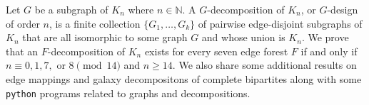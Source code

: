 
Let $G$ be a subgraph of $K_n$ where $n \in \mathbb{N}$. A $G$-decomposition of $K_n$, or $G$-design of order $n$, is a finite collection $\{G_1, \ldots, G_k\}$ of pairwise edge-disjoint subgraphs of $K_n$ that are all isomorphic to some graph $G$ and whose union is $K_{n}$. We prove that an $F$-decomposition of $K_n$ exists for every seven edge forest $F$ if and only if $n \equiv 0,1,7, \text{ or } 8 \pmod{14}$ and $n\geq 14$. We also share some additional results on edge mappings and galaxy decompositons of complete bipartites along with some \verb|python| programs related to graphs and decompositions.

